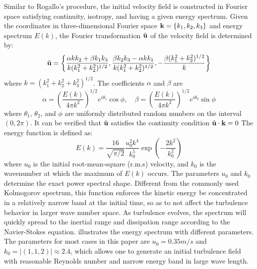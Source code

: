 Similar to Rogallo's procedure, the initial velocity field is constructed in Fourier space satisfying continuity, isotropy, and having a given energy spectrum. Given the coordinates in three-dimensional Fourier space $\mathbf{k} = \{k_1, k_2, k_3\}$ and energy spectrum $E(k)$, the Fourier transformation $\hat{\mathbf{u}}$ of the velocity field is determined by:
\begin{equation}
\hat{\mathbf{u}} = \left\{\frac{\alpha kk_2 + \beta k_1k_3}{k(k_1^2 + k_2^2)^{1/2}},
\frac{\beta k_2k_3 - \alpha k k_1}{k(k_1^2 + k_2^2)^{1/2}}, 
- \frac{\beta (k_1^2 + k_2^2)^{1/2}}{k}\right\}
\end{equation}
where $k = (k_1^2 + k_2^2 + k_3^2)^{1/2}$. The coefficients $\alpha$ and $\beta$ are 
\begin{equation}
\alpha = (\frac{E(k)}{4\pi k^2})^{1/2}e^{i\theta_1}\cos{\phi},\quad
\beta = (\frac{E(k)}{4\pi k^2})^{1/2}e^{i\theta_2}\sin{\phi}
\end{equation}
where $\theta_1$, $\theta_2$, and $\phi$ are uniformly distributed random numbers on the interval $(0, 2\pi)$. It can be verified that $\hat{\mathbf{u}}$ satisfies the continuity condition $\hat{\mathbf{u}}\cdot\mathbf{k} = 0$
The energy function is defined as:
\begin{equation}
E(k) = \frac{16}{\sqrt{\pi/2}}\frac{u^2_0k^4}{k_0^5}\exp(-\frac{2k^2}{k_0^2})
\end{equation}
where $u_0$ is the initial root-mean-square (r.m.s) velocity, and $k_0$ is the wavenumber at which the maximum of $E(k)$ occurs. The parameters $u_0$ and $k_0$ determine
the exact power spectral shape. Different from the commonly used Kolmogorov
spectrum, this function enforces the kinetic energy be concentrated in a
relatively narrow band at the initial time, so as to not affect the turbulence
behavior in larger wave number space. As turbulence evolves, the spectrum will
quickly spread to the inertial range and dissipation range according to the
Navier-Stokes equation.  illustrates the energy spectrum with
different parameters. The parameters for most cases in this paper are $u_0 =
0.35m/s$ and $k_0 = |(1,1,2)| \approx 2.4$, which allows one to generate an
initial turbulence field with reasonable Reynolds number and narrow energy band
in large wave length.

